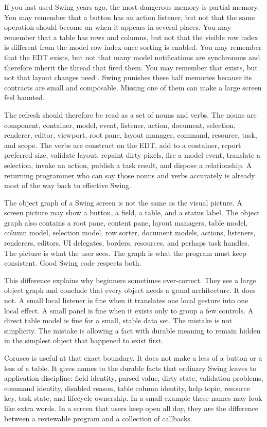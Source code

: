 If you last used Swing years ago, the most dangerous memory is partial memory.
You may remember that a button has an action listener, but not that the same
operation should become an  when it appears in several places. You
may remember that a table has rows and columns, but not that the visible row
index is different from the model row index once sorting is enabled. You may
remember that the EDT exists, but not that many model notifications are
synchronous and therefore inherit the thread that fired them. You may remember
that  exists, but not that layout changes need .
Swing punishes these half memories because its contracts are small and
composable. Missing one of them can make a large screen feel haunted.

The refresh should therefore be read as a set of nouns and verbs. The nouns are
component, container, model, event, listener, action, document, selection,
renderer, editor, viewport, root pane, layout manager, command, resource, task,
and scope. The verbs are construct on the EDT, add to a container, report
preferred size, validate layout, repaint dirty pixels, fire a model event,
translate a selection, invoke an action, publish a task result, and dispose a
relationship. A returning programmer who can say those nouns and verbs
accurately is already most of the way back to effective Swing.

The object graph of a Swing screen is not the same as the visual picture. A
screen picture may show a button, a field, a table, and a status label. The
object graph also contains a root pane, content pane, layout managers, table
model, column model, selection model, row sorter, document models, actions,
listeners, renderers, editors, UI delegates, borders, resources, and perhaps
task handles. The picture is what the user sees. The graph is what the program
must keep consistent. Good Swing code respects both.

This difference explains why beginners sometimes over-correct. They see a large
object graph and conclude that every object needs a grand architecture. It does
not. A small local listener is fine when it translates one local gesture into
one local effect. A small panel is fine when it exists only to group a few
controls. A direct table model is fine for a small, stable data set. The mistake
is not simplicity. The mistake is allowing a fact with durable meaning to remain
hidden in the simplest object that happened to exist first.

Corusco is useful at that exact boundary. It does not make a  less
of a button or a  less of a table. It gives names to the durable
facts that ordinary Swing leaves to application discipline: field identity,
parsed value, dirty state, validation problems, command identity, disabled
reason, table column identity, help topic, resource key, task state, and
lifecycle ownership. In a small example these names may look like extra words.
In a screen that users keep open all day, they are the difference between a
reviewable program and a collection of callbacks.

